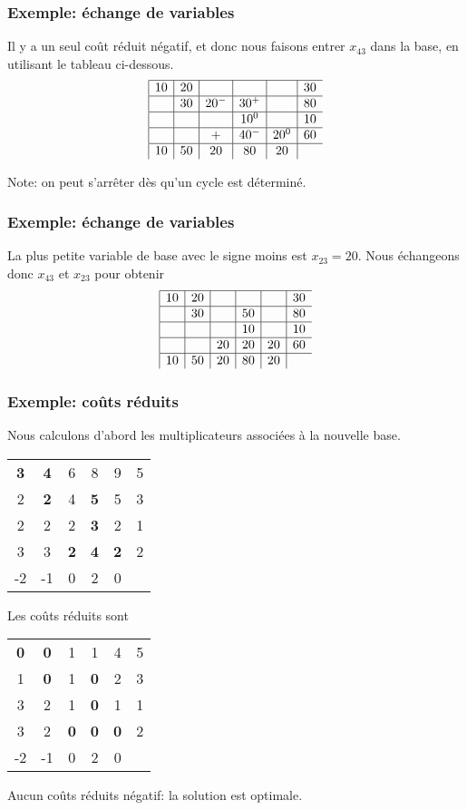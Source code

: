 \documentclass[usepdftitle=false, aspectratio=169]{beamer}
\begin{document}
\begin{frame}
\frametitle{Exemple: échange de variables}

Il y a un seul coût réduit négatif, et donc nous faisons entrer $x_{43}$ dans la base, en utilisant le tableau ci-dessous.
$$
\begin{array}{|c|c|c|c|c|c}
\hline
10 & 20 & & & & 30 \\
\hline
& 30 & 20^- & 30^+ & & 80 \\
\hline
& & & 10^0 & & 10 \\
\hline
& & + & 40^- & 20^0 & 60 \\
\hline
10 & 50 & 20 & 80 & 20 &
\end{array}
$$

Note: on peut s'arrêter dès qu'un cycle est déterminé.

\end{frame}

\begin{frame}
\frametitle{Exemple: échange de variables}

La plus petite variable de base avec le signe moins est $x_{23} = 20$. Nous échangeons donc $x_{43}$ et $x_{23}$ pour obtenir
$$
\begin{array}{|c|c|c|c|c|c}
	\hline
	10 & 20 & & & & 30 \\
	\hline
	& 30 & & 50 & & 80 \\
	\hline
	& & & 10 & & 10 \\
	\hline
	& & 20 & 20 & 20 & 60 \\
	\hline
	10 & 50 & 20 & 80 & 20 &
\end{array}
$$

\end{frame}

\begin{frame}
\frametitle{Exemple: coûts réduits}

Nous calculons d'abord les multiplicateurs associées à la nouvelle base.
\begin{center}
	\begin{tabular}{ccccc|c}
		{\bf 3} & {\bf 4} & 6 & 8 & 9 & 5 \\
		2 & {\bf 2} & 4 & {\bf 5} & 5 & 3 \\
		2 & 2 & 2 & {\bf 3} & 2 & 1 \\
		3 & 3 & {\bf 2} & {\bf 4} & {\bf 2} & 2 \\
		\hline
		-2 & -1 & 0 & 2 & 0 & 
	\end{tabular}
\end{center}
Les coûts réduits sont
\begin{center}
	\begin{tabular}{ccccc|c}
		{\bf 0} & {\bf 0} & 1 & 1 & 4 & 5 \\
		1 & {\bf 0} & 1 & {\bf 0} & 2 & 3 \\
		3 & 2 & 1 & {\bf 0} & 1 & 1 \\
		3 & 2 & {\bf 0} & {\bf 0} & {\bf 0} & 2 \\
		\hline
		-2 & -1 & 0 & 2 & 0 & 
	\end{tabular}
\end{center}
Aucun coûts réduits négatif: la solution est optimale.

\end{frame}
\end{document}
